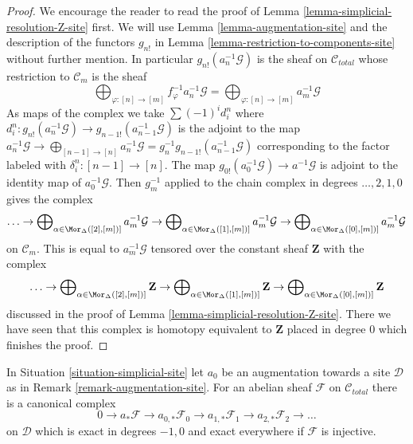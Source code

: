 \begin{proof}
We encourage the reader to read the proof of
Lemma \ref{lemma-simplicial-resolution-Z-site} first.
We will use Lemma \ref{lemma-augmentation-site} and
the description of the functors $g_{n!}$ in
Lemma \ref{lemma-restriction-to-components-site} without further mention.
In particular $g_{n!}(a_n^{-1}\mathcal{G})$ is the
sheaf on $\mathcal{C}_{total}$ whose restriction to $\mathcal{C}_m$
is the sheaf
$$
\bigoplus\nolimits_{\varphi : [n] \to [m]} f_\varphi^{-1}a_n^{-1}\mathcal{G} =
\bigoplus\nolimits_{\varphi : [n] \to [m]} a_m^{-1}\mathcal{G}
$$
As maps of the complex we take $\sum (-1)^i d^n_i$ where
$d^n_i : g_{n!}(a_n^{-1}\mathcal{G}) \to g_{n - 1!}(a_{n - 1}^{-1}\mathcal{G})$
is the adjoint to the map
$a_n^{-1}\mathcal{G} \to \bigoplus_{[n - 1] \to [n]} a_n^{-1}\mathcal{G} =
g_n^{-1}g_{n - 1!}(a_{n - 1}^{-1}\mathcal{G})$
corresponding to the factor labeled with $\delta^n_i : [n - 1] \to [n]$.
The map $g_{0!}(a_0^{-1}\mathcal{G}) \to a^{-1}\mathcal{G}$ is adjoint
to the identity map of $a_0^{-1}\mathcal{G}$.
Then $g_m^{-1}$ applied to the chain complex in degrees
$\ldots, 2, 1, 0$ gives the complex
$$
\ldots \to
\bigoplus\nolimits_{\alpha \in \Mor_\Delta([2], [m])]} a_m^{-1}\mathcal{G} \to
\bigoplus\nolimits_{\alpha \in \Mor_\Delta([1], [m])]} a_m^{-1}\mathcal{G} \to
\bigoplus\nolimits_{\alpha \in \Mor_\Delta([0], [m])]} a_m^{-1}\mathcal{G}
$$
on $\mathcal{C}_m$. This is equal to $a_m^{-1}\mathcal{G}$
tensored over the constant sheaf $\mathbf{Z}$ with the complex
$$
\ldots \to
\bigoplus\nolimits_{\alpha \in \Mor_\Delta([2], [m])]} \mathbf{Z} \to
\bigoplus\nolimits_{\alpha \in \Mor_\Delta([1], [m])]} \mathbf{Z} \to
\bigoplus\nolimits_{\alpha \in \Mor_\Delta([0], [m])]} \mathbf{Z}
$$
discussed in the proof of Lemma \ref{lemma-simplicial-resolution-Z-site}.
There we have seen that this complex is homotopy equivalent to
$\mathbf{Z}$ placed in degree $0$ which finishes the proof.
\end{proof}

\begin{lemma}
\label{lemma-augmentation-cech-complex}
In Situation \ref{situation-simplicial-site} let
$a_0$ be an augmentation towards a site $\mathcal{D}$
as in Remark \ref{remark-augmentation-site}.
For an abelian sheaf $\mathcal{F}$ on $\mathcal{C}_{total}$
there is a canonical complex
$$
0 \to a_*\mathcal{F} \to a_{0, *}\mathcal{F}_0 \to a_{1, *}\mathcal{F}_1 \to
a_{2, *}\mathcal{F}_2 \to \ldots
$$
on $\mathcal{D}$ which is exact in degrees $-1, 0$ and
exact everywhere if $\mathcal{F}$ is injective.
\end{lemma}

